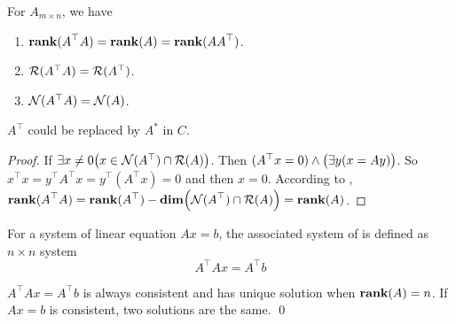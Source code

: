 \begin{theorem}\label{rankofadjoint}
    For $A_{m \times n}$, we have
    \begin{enumerate}
        \item $\displaystyle \mathbf{rank}( A^\top A ) = \displaystyle \mathbf{rank}( A ) = \displaystyle \mathbf{rank}( A A^\top )$.
        \item $\mathcal{R}(A^\top A) = \mathcal{R}(A^\top)$.
        \item $\mathcal{N}(A^\top A) = \mathcal{N}(A)$.
    \end{enumerate}
    $A^\top$ could be replaced by $A^*$ in $C$.
\end{theorem}
\begin{proof}
    If $\exists x \neq 0 \mleft(x \in \nullspace{A^\top} \cap \rangespace{A} \mright)$. Then $(A^\top x = 0) \wedge \mleft(\exists y(x = A y) \mright)$. So $x^\top x = y^\top A^\top x = y^\top ( A^\top x) = 0 $ and then $x =0$. According to , $\rank{A^\top A} = \rank{A^\top} - \dimension{\nullspace{A^\top} \cap \rangespace{A}} = \rank{A}$.
\end{proof}

\begin{theorem}
    For a system of linear equation $Ax = b$, the associated system of  is defined as $n \times n$ system
    \begin{equation}
        A^\top A x = A^\top b
    \end{equation}
    
    $A^\top A x = A^\top b$ is always consistent and has unique solution when $\displaystyle \mathbf{rank}( A ) = n$. If $Ax=b$ is consistent, two solutions are the same. \qed
\end{theorem}



